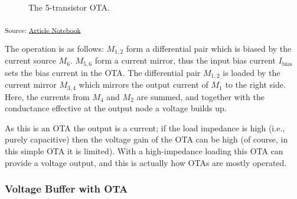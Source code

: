\documentclass[
  a4paper,
  DIV=11,
  numbers=noendperiod]{scrartcl}
\begin{document}
\begin{figure}[H]


\caption{\label{fig-basic-ota}The 5-transistor OTA.}

\end{figure}%

\textsubscript{Source:
\href{https://iic-jku.github.io/analog-circuit-design/index.qmd.html}{Article
Notebook}}

The operation is as follows: \(M_{1,2}\) form a differential pair which
is biased by the current source \(M_6\). \(M_{5,6}\) form a current
mirror, thus the input bias current \(I_\mathrm{bias}\) sets the bias
current in the OTA. The differential pair \(M_{1,2}\) is loaded by the
current mirror \(M_{3,4}\) which mirrors the output current of \(M_1\)
to the right side. Here, the currents from \(M_4\) and \(M_2\) are
summed, and together with the conductance effective at the output node a
voltage builds up.

As this is an OTA the output is a current; if the load impedance is high
(i.e., purely capacitive) then the voltage gain of the OTA can be high
(of course, in this simple OTA it is limited). With a high-impedance
loading this OTA can provide a voltage output, and this is actually how
OTAs are mostly operated.

\subsubsection{Voltage Buffer with OTA}\label{voltage-buffer-with-ota}
\end{document}

